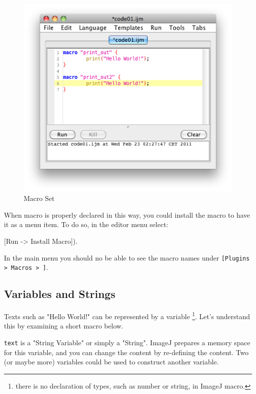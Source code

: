 \documentclass[11pt,a4paper,oneside]{report}
\newenvironment{indentFiji}%
{\begin{list}{}%
         {\setlength{\leftmargin}{1em}}%
         \item[]%
}
{\end{list}}
\newcommand{\ijmenu}[1]{\texttt{\small#1}}
\newcommand{\ilcom}[1]{\texttt{\small#1}}
\begin{document}
\begin{figure}[h!]
\begin{center}
\includegraphics[scale=0.6]{fig/editor_MacroSet.png}
\caption{Macro Set} \label{fig_MacroSetInMenu}
\end{center}
\end{figure}
When macro is properly declared in this way, you could install the macro to have it as a menu item. To do so, in the editor menu select: 
\begin{indentFiji}
[Run -> Install Macro]).
\end{indentFiji}
In the main menu you should no be able to see the macro names under \ijmenu{[Plugins > Macros > ]}.


\subsection{Variables and Strings}
Texts such as "Hello World!" can be represented by a variable 
\footnote{there is no declaration of types, such as number or string, in ImageJ macro.}.
Let's understand this by examining a short macro below.


\ilcom{text} is a "String Variable" or simply a "String". 
ImageJ prepares a memory space for this variable, and you can change the content by re-defining the content. Two (or maybe more) variables could be used to construct another variable. 
\end{document}
